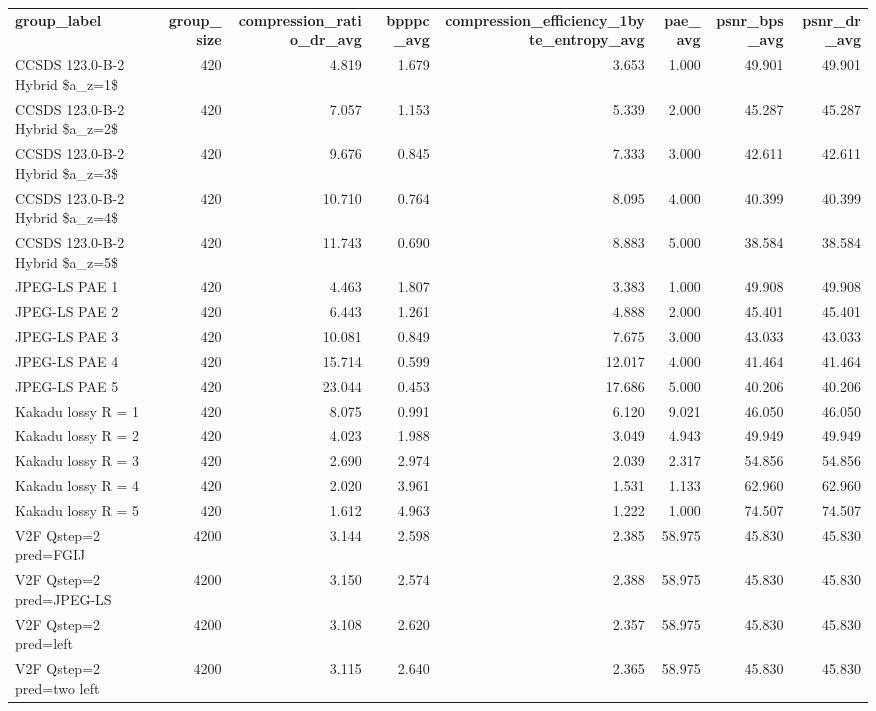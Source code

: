 \begin{tabular}{lrrrrrrr}
\textbf{ group\_label } & \textbf{ group\_size } & \textbf{ compression\_ratio\_dr\_avg } & \textbf{ bpppc\_avg } & \textbf{ compression\_efficiency\_1byte\_entropy\_avg } & \textbf{ pae\_avg } & \textbf{ psnr\_bps\_avg } & \textbf{ psnr\_dr\_avg } \\
CCSDS 123.0-B-2 Hybrid \$a\_z=1\$ & 420 & 4.819 & 1.679 & 3.653 & 1.000 & 49.901 & 49.901 \\
CCSDS 123.0-B-2 Hybrid \$a\_z=2\$ & 420 & 7.057 & 1.153 & 5.339 & 2.000 & 45.287 & 45.287 \\
CCSDS 123.0-B-2 Hybrid \$a\_z=3\$ & 420 & 9.676 & 0.845 & 7.333 & 3.000 & 42.611 & 42.611 \\
CCSDS 123.0-B-2 Hybrid \$a\_z=4\$ & 420 & 10.710 & 0.764 & 8.095 & 4.000 & 40.399 & 40.399 \\
CCSDS 123.0-B-2 Hybrid \$a\_z=5\$ & 420 & 11.743 & 0.690 & 8.883 & 5.000 & 38.584 & 38.584 \\
JPEG-LS PAE 1 & 420 & 4.463 & 1.807 & 3.383 & 1.000 & 49.908 & 49.908 \\
JPEG-LS PAE 2 & 420 & 6.443 & 1.261 & 4.888 & 2.000 & 45.401 & 45.401 \\
JPEG-LS PAE 3 & 420 & 10.081 & 0.849 & 7.675 & 3.000 & 43.033 & 43.033 \\
JPEG-LS PAE 4 & 420 & 15.714 & 0.599 & 12.017 & 4.000 & 41.464 & 41.464 \\
JPEG-LS PAE 5 & 420 & 23.044 & 0.453 & 17.686 & 5.000 & 40.206 & 40.206 \\
Kakadu lossy R = 1 & 420 & 8.075 & 0.991 & 6.120 & 9.021 & 46.050 & 46.050 \\
Kakadu lossy R = 2 & 420 & 4.023 & 1.988 & 3.049 & 4.943 & 49.949 & 49.949 \\
Kakadu lossy R = 3 & 420 & 2.690 & 2.974 & 2.039 & 2.317 & 54.856 & 54.856 \\
Kakadu lossy R = 4 & 420 & 2.020 & 3.961 & 1.531 & 1.133 & 62.960 & 62.960 \\
Kakadu lossy R = 5 & 420 & 1.612 & 4.963 & 1.222 & 1.000 & 74.507 & 74.507 \\
V2F Qstep=2 pred=FGIJ & 4200 & 3.144 & 2.598 & 2.385 & 58.975 & 45.830 & 45.830 \\
V2F Qstep=2 pred=JPEG-LS & 4200 & 3.150 & 2.574 & 2.388 & 58.975 & 45.830 & 45.830 \\
V2F Qstep=2 pred=left & 4200 & 3.108 & 2.620 & 2.357 & 58.975 & 45.830 & 45.830 \\
V2F Qstep=2 pred=two left & 4200 & 3.115 & 2.640 & 2.365 & 58.975 & 45.830 & 45.830 \\

\end{tabular}
